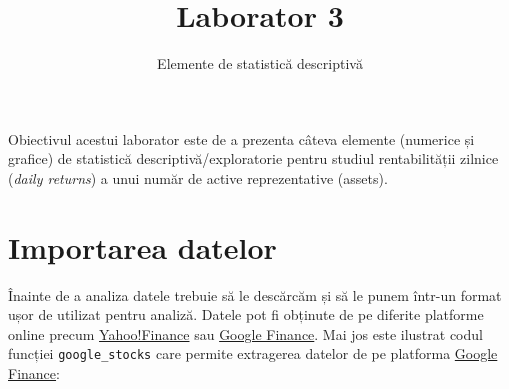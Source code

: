 \documentclass[]{article}
\title{Laborator 3}
\subtitle{Elemente de statistică descriptivă}
\author{}
\date{}
\begin{document}
\maketitle

\thispagestyle{fancy}

Obiectivul acestui laborator este de a prezenta câteva elemente
(numerice și grafice) de statistică descriptivă/exploratorie pentru
studiul rentabilității zilnice (\emph{daily returns}) a unui număr de
active reprezentative (assets).

\section{Importarea datelor}\label{importarea-datelor}

Înainte de a analiza datele trebuie să le descărcăm și să le punem
într-un format ușor de utilizat pentru analiză. Datele pot fi obținute
de pe diferite platforme online precum
\href{https://finance.yahoo.com/}{Yahoo!Finance} sau
\href{https://finance.google.com/finance}{Google Finance}. Mai jos este
ilustrat codul funcției \texttt{google\_stocks} care permite extragerea
datelor de pe platforma \href{https://finance.google.com/finance}{Google
Finance}:
\end{document}
